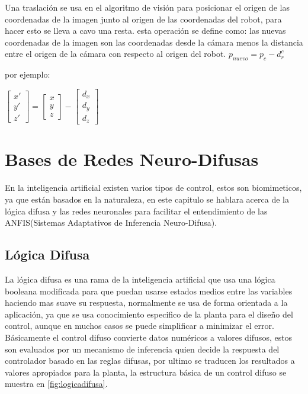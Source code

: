 Una traslación se usa en el algoritmo de visión para posicionar el origen de las coordenadas de la imagen junto al origen de las coordenadas del robot, para hacer esto se lleva a cavo una resta.
esta operación se define como:  las nuevas coordenadas de la imagen son las coordenadas desde la cámara menos la distancia entre el origen de la cámara con respecto al origen del robot.
$p_{nuevo}=p_c-d_{r}^{c}$

por ejemplo:

$\begin{bmatrix}
x'  \\ 
y' \\ 
z'
\end{bmatrix} = 
\begin{bmatrix}
x  \\ 
y \\ 
z
\end{bmatrix}-\begin{bmatrix}
d_x	 \\ 
d_y	 \\ 
d_z	 
\end{bmatrix} $





\chapter{Bases de Redes Neuro-Difusas}\label{basesneurodifusas}
En la inteligencia artificial existen varios tipos de control, estos son biomimeticos, ya que están basados en la naturaleza, en este capitulo se hablara acerca de la lógica difusa y las redes neuronales para facilitar el entendimiento de las ANFIS(Sistemas Adaptativos de Inferencia Neuro-Difusa).

\section{Lógica Difusa}

La lógica difusa es una rama de la inteligencia artificial que usa una lógica booleana modificada para que puedan usarse estados medios entre las variables haciendo mas suave su respuesta, normalmente se usa de forma orientada a la aplicación, ya que se usa conocimiento especifico de la planta para el diseño del control, aunque en muchos casos se puede simplificar a minimizar el error. 
Básicamente el control difuso convierte datos numéricos a valores difusos, estos son evaluados por un mecanismo de inferencia quien decide la respuesta del controlador basado en las reglas difusas, por ultimo se traducen los resultados a valores apropiados para la planta, la estructura básica de un control difuso se muestra en \cref{fig:logicadifusa}.


